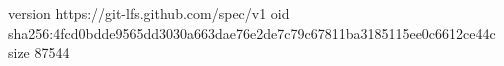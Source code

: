 version https://git-lfs.github.com/spec/v1
oid sha256:4fcd0bdde9565dd3030a663dae76e2de7c79c67811ba3185115ee0c6612ce44c
size 87544
